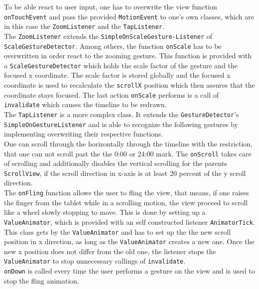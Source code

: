 To  be able react to user input, one has to overwrite the view function \lstinline$onTouchEvent$ and pass the provided \lstinline$MotionEvent$ to one's own classes, which are in this case the \lstinline$ZoomListener$ and the \lstinline$TapListener$.\\
The  \lstinline$ZoomListener$ extends the \lstinline$SimpleOnScaleGesture-Listener$ of \lstinline$ScaleGestureDetector$. Among others, the function \lstinline$onScale$ has to be overwritten in order react to the zooming gesture. This function is provided with a \lstinline$ScaleGestureDetector$ which holds the scale factor of the gesture and the focused x coordinate. The scale factor is stored globally and the focused x coordinate is used to recalculate the \lstinline$scrollX$ position which then assures that the coordinate stays focused. The last action \lstinline$onScale$ performs is a call of \lstinline$invalidate$ which causes the timeline to be redrawn.\\
The  \lstinline$TapListener$ is a more complex class. It extends the \lstinline$GestureDetector$'s  \lstinline$SimpleOnGestureListener$ and is able to recognize the following gestures by implementing overwriting their respective functions.\\
One  can scroll through the horizontally through the timeline with the restriction, that one can not scroll past the the 0:00 or 24:00 mark. The \lstinline$onScroll$ takes care of scrolling and additionally disables the vertical scrolling for the parents \lstinline$ScrollView$, if the scroll direction in x-axis is at least 20 percent of the y scroll direction.\\
The \lstinline$onFling$ function allows the user to fling the view, that means, if one raises the finger from the tablet while in a scrolling motion, the view proceed to scroll like a wheel slowly stopping to move. This is done by setting up a \lstinline$ValueAnimator$, which is provided with an self constructed listener \lstinline$AnimatorTick$. This class gets by the \lstinline$ValueAnimator$ and has to set up the the new scroll position in x direction, as long as the \lstinline$ValueAnimator$ creates a new one. Once the new x position does not differ from the old one, the listener stops the \lstinline$ValueAnimator$ to stop unnecessary callings of \lstinline$invalidate$.\\
\lstinline$onDown$ is called every time the user performs a gesture on the view and is used to stop the fling animation.\\
